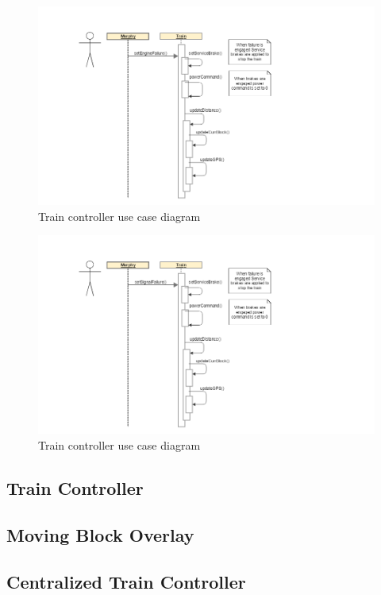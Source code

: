 \documentclass[]{article}
\begin{document}
\begin{figure}[H]
	\centering
	\includegraphics[scale=.2]{train_model_sqd_toggle_engine_failure.png}
	\caption{Train controller use case diagram}
\end{figure}

\begin{figure}[H]
	\centering
	\includegraphics[scale=.2]{train_model_sqd_toggle_signal_failure.png}
	\caption{Train controller use case diagram}
\end{figure}

\subsection{Train Controller}
\subsection{Moving Block Overlay}
\subsection{Centralized Train Controller}
\end{document}
